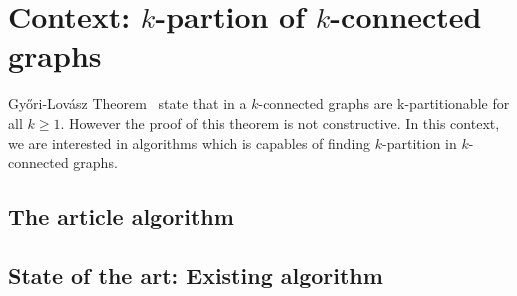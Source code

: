 \section{Context: $k$-partion of $k$-connected graphs}
Gy{\H o}ri-Lovász Theorem~\cite{GE78,LL77} state that in a $k$-connected graphs are 
k-partitionable for all $k \geq 1$. However the proof of this theorem
is not constructive. In this context, we are interested in algorithms which
is capables of finding $k$-partition in $k$-connected graphs.

\subsection{The article algorithm}

\subsection{State of the art: Existing algorithm}


